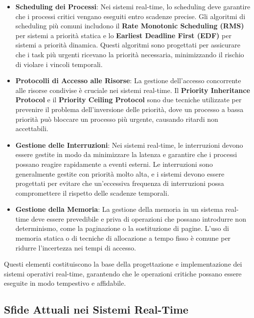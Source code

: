 \documentclass[11pt,a4paper]{report}
\begin{document}
\begin{itemize}
    \item \textbf{Scheduling dei Processi}: Nei sistemi real-time, lo scheduling deve garantire che i processi critici vengano eseguiti entro scadenze precise. Gli algoritmi di scheduling più comuni includono il \textbf{Rate Monotonic Scheduling (RMS)} per sistemi a priorità statica e lo \textbf{Earliest Deadline First (EDF)} per sistemi a priorità dinamica. Questi algoritmi sono progettati per assicurare che i task più urgenti ricevano la priorità necessaria, minimizzando il rischio di violare i vincoli temporali.

    \item \textbf{Protocolli di Accesso alle Risorse}: La gestione dell'accesso concorrente alle risorse condivise è cruciale nei sistemi real-time. Il \textbf{Priority Inheritance Protocol} e il \textbf{Priority Ceiling Protocol} sono due tecniche utilizzate per prevenire il problema dell'inversione delle priorità, dove un processo a bassa priorità può bloccare un processo più urgente, causando ritardi non accettabili.

    \item \textbf{Gestione delle Interruzioni}: Nei sistemi real-time, le interruzioni devono essere gestite in modo da minimizzare la latenza e garantire che i processi possano reagire rapidamente a eventi esterni. Le interruzioni sono generalmente gestite con priorità molto alta, e i sistemi devono essere progettati per evitare che un'eccessiva frequenza di interruzioni possa compromettere il rispetto delle scadenze temporali.

    \item \textbf{Gestione della Memoria}: La gestione della memoria in un sistema real-time deve essere prevedibile e priva di operazioni che possano introdurre non determinismo, come la paginazione o la sostituzione di pagine. L'uso di memoria statica o di tecniche di allocazione a tempo fisso è comune per ridurre l'incertezza nei tempi di accesso.
\end{itemize}

Questi elementi costituiscono la base della progettazione e implementazione dei sistemi operativi real-time, garantendo che le operazioni critiche possano essere eseguite in modo tempestivo e affidabile.

\subsection{Sfide Attuali nei Sistemi Real-Time}
\end{document}
